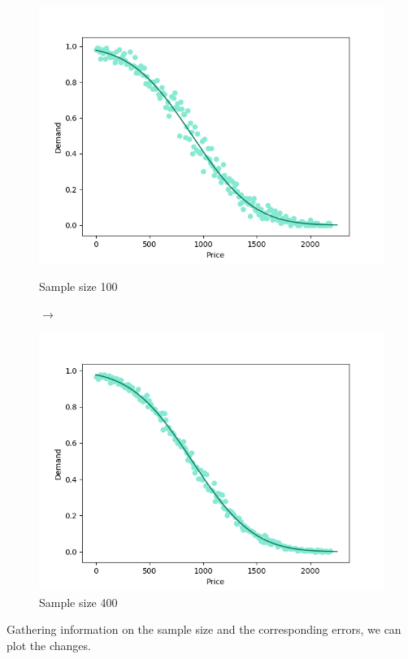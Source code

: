 \documentclass[11pt, a4paper]{article}
\begin{document}
		\begin{figure}[H]
			\begin{minipage}{0.48\textwidth}
				\centering
				\includegraphics[width=\linewidth]{Exp_and_math_100}
				\caption{Sample size 100}\label{Fig:Data3}
			\end{minipage}$\longrightarrow$
			\begin{minipage}{0.48\textwidth}
				\centering
				\includegraphics[width=\linewidth]{Exp_and_math_400}
				\caption{Sample size 400}\label{Fig:Data4}
			\end{minipage}
		\end{figure}\par\noindent
		Gathering information on the sample size and the corresponding errors, we can plot the changes.
\end{document}
